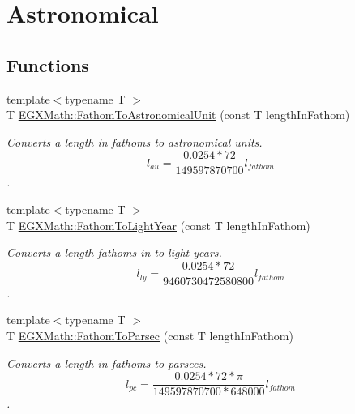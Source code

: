 \hypertarget{group___e_g_x_math-_conversions-_length_conversions-_nautical-_fathom-_astronomical}{}\section{Astronomical}
\label{group___e_g_x_math-_conversions-_length_conversions-_nautical-_fathom-_astronomical}
\subsection*{Functions}
\begin{DoxyCompactItemize}
\item 
{\footnotesize template$<$typename T $>$ }\\T \mbox{\hyperlink{group___e_g_x_math-_conversions-_length_conversions-_nautical-_fathom-_astronomical_gaf453178809cd1255a67509e03dc55f6b}{E\+G\+X\+Math\+::\+Fathom\+To\+Astronomical\+Unit}} (const T length\+In\+Fathom)
\begin{DoxyCompactList}\small\item\em Converts a length in fathoms to astronomical units. \[ l_{au}=\frac{0.0254 * 72}{149597870700} l_{fathom} \]. \end{DoxyCompactList}\item 
{\footnotesize template$<$typename T $>$ }\\T \mbox{\hyperlink{group___e_g_x_math-_conversions-_length_conversions-_nautical-_fathom-_astronomical_gaa45a6119423d8aa6928dd9da3fe553e6}{E\+G\+X\+Math\+::\+Fathom\+To\+Light\+Year}} (const T length\+In\+Fathom)
\begin{DoxyCompactList}\small\item\em Converts a length fathoms in to light-\/years. \[ l_{ly}=\frac{0.0254 * 72}{9460730472580800} l_{fathom} \]. \end{DoxyCompactList}\item 
{\footnotesize template$<$typename T $>$ }\\T \mbox{\hyperlink{group___e_g_x_math-_conversions-_length_conversions-_nautical-_fathom-_astronomical_ga2ab90a2b4e56d3787d12483704d76c2d}{E\+G\+X\+Math\+::\+Fathom\+To\+Parsec}} (const T length\+In\+Fathom)
\begin{DoxyCompactList}\small\item\em Converts a length in fathoms to parsecs. \[ l_{pc}=\frac{0.0254 * 72 * \pi}{149597870700 * 648000} l_{fathom} \]. \end{DoxyCompactList}\end{DoxyCompactItemize}


